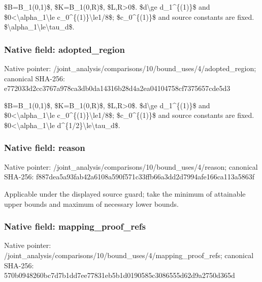 \documentclass[10pt,a4paper]{article}
\begin{document}
\$B=B\_1(0,1)\$, \$K=B\_1(0,R)\$, \$L,R>0\$. \$d\textbackslash{}ge d\_1\textasciicircum{}\{(1)\}\$ and \$0<\textbackslash{}alpha\_1\textbackslash{}le c\_0\textasciicircum{}\{(1)\}\textbackslash{}le1/8\$; \$c\_0\textasciicircum{}\{(1)\}\$ and source constants are fixed. \$\textbackslash{}alpha\_1\textbackslash{}le\textbackslash{}tau\_d\$.


\subsubsection{Native field: adopted\_region}


Native pointer: /joint\_analysis/comparis\allowbreak{}ons/10/bound\_uses/4/adop\allowbreak{}ted\_region; canonical SHA-256: e772033d2cc3767a978ca3db\allowbreak{}0da14316b28d4a2ea0410475\allowbreak{}8cf7375657cde5d3


\$B=B\_1(0,1)\$, \$K=B\_1(0,R)\$, \$L,R>0\$. \$d\textbackslash{}ge d\_1\textasciicircum{}\{(1)\}\$ and \$0<\textbackslash{}alpha\_1\textbackslash{}le c\_0\textasciicircum{}\{(1)\}\textbackslash{}le1/8\$; \$c\_0\textasciicircum{}\{(1)\}\$ and source constants are fixed. \$0<\textbackslash{}alpha\_1\textbackslash{}le d\textasciicircum{}\{1/2\}\textbackslash{}le\textbackslash{}tau\_d\$.


\subsubsection{Native field: reason}


Native pointer: /joint\_analysis/comparis\allowbreak{}ons/10/bound\_uses/4/reas\allowbreak{}on; canonical SHA-256: f887dea5a93fab42a6108a59\allowbreak{}0f571c33ffb66a3dd2d7994a\allowbreak{}fe166ca113a5863f


Applicable under the displayed source guard; take the minimum of attainable upper bounds and maximum of necessary lower bounds.


\subsubsection{Native field: mapping\_proof\_refs}


Native pointer: /joint\_analysis/comparis\allowbreak{}ons/10/bound\_uses/4/mapp\allowbreak{}ing\_proof\_refs; canonical SHA-256: 570b0948260bc7d7b1dd7ee7\allowbreak{}7831eb5b1d0190585c308655\allowbreak{}5d62d9a2750d365d
\end{document}

